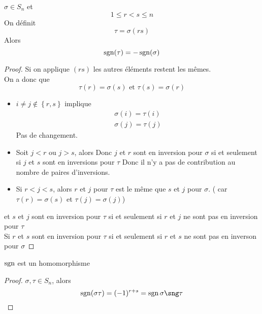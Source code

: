 \documentclass[../main.tex]{subfiles}
\begin{document}
\begin{lemma}
$\sigma \in S_n$ et
\[ 
1 \leq r < s \leq n
\]
On définit
\[ 
	\tau = \sigma( rs) 
\]
Alors
\[ 
	\operatorname*{sgn}( \tau) = - \operatorname*{sgn}( \sigma) 
\]

\end{lemma}
\begin{proof}
	Si on applique $( rs) $ les autres éléments restent les mêmes.\\
	On a donc que
	\[ 
		\tau( r) = \sigma( s) \text{ et } \tau( s) = \sigma( r) 
	\]
	
\begin{itemize}
\item $i\neq j \notin \left\{ r,s \right\} $ implique
	\begin{align*}
		\sigma( i) = \tau( i) \\
		\sigma( j) = \tau( j) 
	\end{align*}
Pas de changement.
\item Soit $j < r$ ou $j>s$, alors
	Donc $j$ et $r$ sont en inversion pour $\sigma$ si et seulement si $j$ et $s$ sont en inversions pour $\tau$
Donc il n'y a pas de contribution au nombre de paires d'inversions.
\item Si $r< j < s$, alors $r$ et $j$ pour $\tau$ est le même que $s$ et $j$ pour $\sigma$. ( car $\tau( r) = \sigma( s)$ et $\tau( j) = \sigma( j) $) 
\end{itemize}
et $s$ et $j$ sont en inversion pour $\tau$ si et seulement si $r$ et $j$ ne sont pas en inversion pour  $\tau$ \\
Si  $r$ et $s$ sont en inversion pour $\tau$ si et seulement si $r$
et $s$ ne sont pas en inverson pour $\sigma$
\end{proof}
\begin{crly}
$\operatorname*{sgn}$ est un homomorphisme
\end{crly}
\begin{proof}
$\sigma, \tau \in S_n$, alors
\[ 
	\sgn( \sigma\tau) = ( -1) ^{r+s} = \sgn \sigma \sng \tau
\]

\end{proof}
\end{document}
